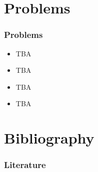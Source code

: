 \documentclass{beamer}
\begin{document}
\section{Problems}
\begin{frame}\frametitle{Problems}
\begin{itemize}
	\item {TBA} 
	\item {TBA}
	\item {TBA}
	\item {TBA}
\end{itemize}
\end{frame}
      
\section{Bibliography}
\begin{frame}[allowframebreaks] \frametitle{Literature} 


\end{frame}
\end{document}
